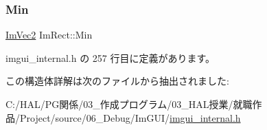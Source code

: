 \subsubsection{\texorpdfstring{Min}{Min}}
{\footnotesize\ttfamily \mbox{\hyperlink{struct_im_vec2}{Im\+Vec2}} Im\+Rect\+::\+Min}



 imgui\+\_\+internal.\+h の 257 行目に定義があります。



この構造体詳解は次のファイルから抽出されました\+:\begin{DoxyCompactItemize}
\item 
C\+:/\+H\+A\+L/\+P\+G関係/03\+\_\+作成プログラム/03\+\_\+\+H\+A\+L授業/就職作品/\+Project/source/06\+\_\+\+Debug/\+Im\+G\+U\+I/\mbox{\hyperlink{imgui__internal_8h}{imgui\+\_\+internal.\+h}}\end{DoxyCompactItemize}
